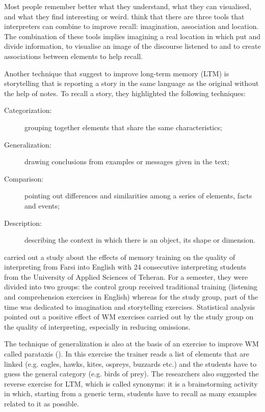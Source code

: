 \documentclass[output=paper]{../langscibook}
\begin{document}
Most people remember better what they understand, what they can visualised, and what they find interesting or weird. \citet{YenkimalekivanHeuven2013,YenkimalekivanHeuven2017} think that there are three tools that interpreters can combine to improve recall: imagination, association and location. The combination of these tools implies imagining a real location in which put and divide information, to visualise an image of the discourse listened to and to create associations between elements to help recall.

Another technique that \citet{YenkimalekivanHeuven2013,YenkimalekivanHeuven2017} suggest to improve long-term memory (LTM) is storytelling that is reporting a story in the same language as the original without the help of notes. To recall a story, they highlighted the following techniques:

\begin{description}
\item[Categorization:] grouping together elements that share the same characteristics;
\item[Generalization:] drawing conclusions from examples or messages given in the text;
\item[Comparison:] pointing out differences and similarities among a series of elements, facts and events;
\item[Description:] describing the context in which there is an object, its shape or dimension.
\end{description}

\citet{YenkimalekivanHeuven2017} carried out a study about the effects of memory training on the quality of interpreting from Farsi into English with 24 consecutive interpreting students from the University of Applied Sciences of Teheran. For a semester, they were divided into two groups: the control group received traditional training (listening and comprehension exercises in English) whereas for the study group, part of the time was dedicated to imagination and storytelling exercises. Statistical analysis pointed out a positive effect of WM exercises carried out by the study group on the quality of interpreting, especially in reducing omissions.

The technique of generalization is also at the basis of an exercise to improve WM called parataxis (\citealt{BallesterJiminezHurtado1992}). In this exercise the trainer reads a list of elements that are linked (e.g. eagles, hawks, kites, ospreys, buzzards etc.) and the students have to guess the general category (e.g. birds of prey). The researchers also suggested the reverse exercise for LTM, which is called synonyms: it is a brainstorming activity in which, starting from a generic term, students have to recall as many examples related to it as possible.
\end{document}
